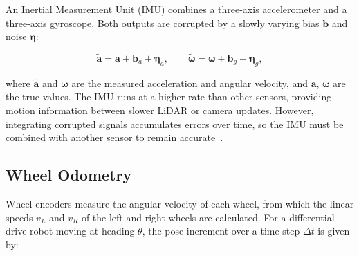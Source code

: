 An Inertial Measurement Unit (IMU) combines a three-axis accelerometer and a
three-axis gyroscope.
Both outputs are corrupted by a slowly varying bias $\mathbf{b}$ and noise $\boldsymbol{\eta}$:

\begin{equation}
  \tilde{\mathbf{a}} = \mathbf{a} + \mathbf{b}_a + \boldsymbol{\eta}_a, \qquad
  \tilde{\boldsymbol{\omega}} = \boldsymbol{\omega} + \mathbf{b}_g + \boldsymbol{\eta}_g,
  \label{eq:imu_model}
\end{equation}

\noindent where $\tilde{\mathbf{a}}$ and $\tilde{\boldsymbol{\omega}}$ are the
measured acceleration and angular velocity, and $\mathbf{a}$,
$\boldsymbol{\omega}$ are the true values.
The IMU runs at a higher rate than other sensors, providing motion information
between slower LiDAR or camera updates.
However, integrating corrupted signals accumulates errors over time, so the
IMU must be combined with another sensor to remain accurate~\cite{forster2017manifold}.

%

\subsection{Wheel Odometry}

Wheel encoders measure the angular velocity of each wheel, from which the
linear speeds $v_L$ and $v_R$ of the left and right wheels are calculated.
For a differential-drive robot moving at heading $\theta$, the pose increment
over a time step $\Delta t$ is given by:

